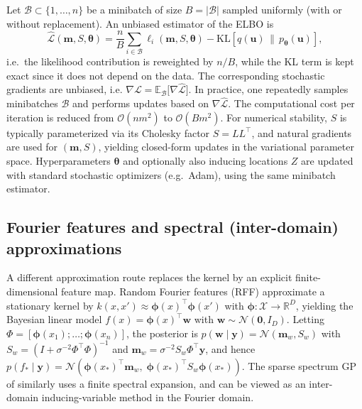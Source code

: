 \documentclass[11pt,a4paper]{article}
\newcommand{\bmm}{\boldsymbol{m}}
\newcommand{\by}{\boldsymbol{y}}
\newcommand{\btheta}{\boldsymbol{\theta}}
\begin{document}
Let $\mathcal{B}\subset\{1,\dots,n\}$ be a minibatch of size $B=|\mathcal{B}|$ sampled uniformly (with or without replacement). An unbiased estimator of the ELBO is
\begin{equation}\label{eq:ELBO_minibatch} \widehat{\mathcal{L}}(\bmm,S,\btheta)=\frac{n}{B}\sum_{i\in\mathcal{B}} \ell_i(\bmm,S,\btheta)- \mathrm{KL}\!\left[q(\boldsymbol{u})\,\|\,p_{\btheta}(\boldsymbol{u})\right],\end{equation}
i.e.\ the likelihood contribution is reweighted by $n/B$, while the KL term is kept exact since it does not depend on the data. The corresponding stochastic gradients are unbiased, i.e. $\nabla \mathcal{L}=\mathbb{E}_{\mathcal{B}}\bigl[\nabla \widehat{\mathcal{L}}\bigr].$
In practice, one repeatedly samples minibatches $\mathcal{B}$ and performs updates based on $\nabla \widehat{\mathcal{L}}$. The computational cost per iteration is reduced from $\mathcal{O}(n m^2)$ to $\mathcal{O}(B m^2)$. For numerical stability, $S$ is typically parameterized via its Cholesky factor $S = LL^\top$, and natural gradients are used for $(\bmm,S)$, yielding closed-form updates in the variational parameter space. Hyperparameters $\btheta$ and optionally also inducing locations $Z$ are updated with standard stochastic optimizers (e.g.\ Adam), using the same minibatch estimator.

\subsection{Fourier features and spectral (inter-domain) approximations}
A different approximation route replaces the kernel by an explicit finite-dimensional feature map. Random Fourier features (RFF) \citep{Rahimi2007RandomFF} approximate a stationary kernel by $k(x,x')\approx \boldsymbol{\phi}(x)^\top\boldsymbol{\phi}(x')$ with $\boldsymbol{\phi}:\mathcal{X}\to\mathbb{R}^D$, yielding the Bayesian linear model $f(x)=\boldsymbol{\phi}(x)^\top \boldsymbol{w}$ with $\boldsymbol{w}\sim\mathcal{N}(\bm 0,I_D)$. Letting $\Phi=[\boldsymbol{\phi}(x_1);\dots;\boldsymbol{\phi}(x_n)]$, the posterior is $p(\boldsymbol{w}\mid \by)=\mathcal{N}(\boldsymbol{m}_w,S_w)$ with $S_w=(I+\sigma^{-2}\Phi^\top\Phi)^{-1}$ and $\boldsymbol{m}_w=\sigma^{-2}S_w\Phi^\top \by$, and hence $p(f_\ast\mid \by)=\mathcal{N}(\boldsymbol{\phi}(x_\ast)^\top \boldsymbol{m}_w,\;\boldsymbol{\phi}(x_\ast)^\top S_w\boldsymbol{\phi}(x_\ast))$. The sparse spectrum GP of \cite{JMLR:v11:lazaro-gredilla10a} similarly uses a finite spectral expansion, and can be viewed as an inter-domain inducing-variable method in the Fourier domain.
\end{document}
